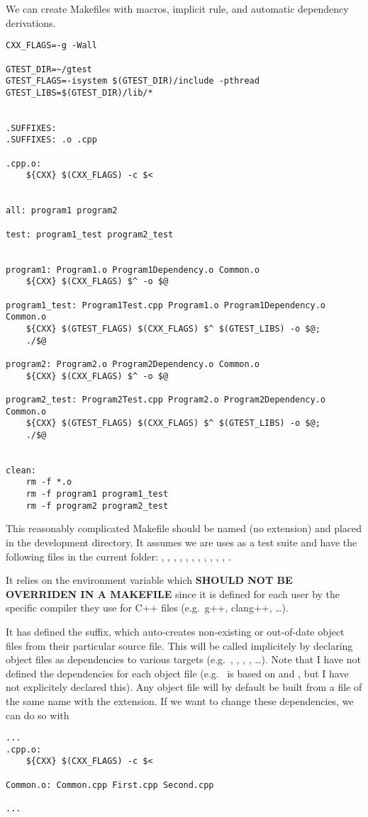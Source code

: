 \documentclass[12pt]{article}
\begin{document}
We can create Makefiles with macros, implicit rule, and automatic dependency derivations.

\begin{verbatim}
CXX_FLAGS=-g -Wall

GTEST_DIR=~/gtest
GTEST_FLAGS=-isystem $(GTEST_DIR)/include -pthread
GTEST_LIBS=$(GTEST_DIR)/lib/*


.SUFFIXES:
.SUFFIXES: .o .cpp

.cpp.o:
    ${CXX} $(CXX_FLAGS) -c $<


all: program1 program2

test: program1_test program2_test


program1: Program1.o Program1Dependency.o Common.o
    ${CXX} $(CXX_FLAGS) $^ -o $@

program1_test: Program1Test.cpp Program1.o Program1Dependency.o Common.o
    ${CXX} $(GTEST_FLAGS) $(CXX_FLAGS) $^ $(GTEST_LIBS) -o $@;
    ./$@

program2: Program2.o Program2Dependency.o Common.o
    ${CXX} $(CXX_FLAGS) $^ -o $@

program2_test: Program2Test.cpp Program2.o Program2Dependency.o Common.o
    ${CXX} $(GTEST_FLAGS) $(CXX_FLAGS) $^ $(GTEST_LIBS) -o $@;
    ./$@


clean:
    rm -f *.o
    rm -f program1 program1_test
    rm -f program2 program2_test
\end{verbatim}

This reasonably complicated Makefile should be named  (no extension) and placed in the development directory. It assumes we are uses  as a test suite and have the following files in the current folder: , , , , , , , , , , , 
.

It relies on the  environment variable which {\bf SHOULD NOT BE OVERRIDEN IN A MAKEFILE} since it is defined for each user by the specific compiler they use for C++ files (e.g.\ g++, clang++, \dots).

It has defined the  suffix, which auto-creates non-existing or out-of-date object files from their particular source file. This will be called implicitely by declaring object files as dependencies to various targets (e.g.\ , , , , \dots). Note that I have not defined the dependencies for each object file (e.g.\  is based on  and , but I have not explicitely declared this). Any object file will by default be built from a file of the same name with the  extension. If we want to change these dependencies, we can do so with
\begin{verbatim}
...
.cpp.o:
    ${CXX} $(CXX_FLAGS) -c $<

Common.o: Common.cpp First.cpp Second.cpp

...
\end{verbatim}
\end{document}
